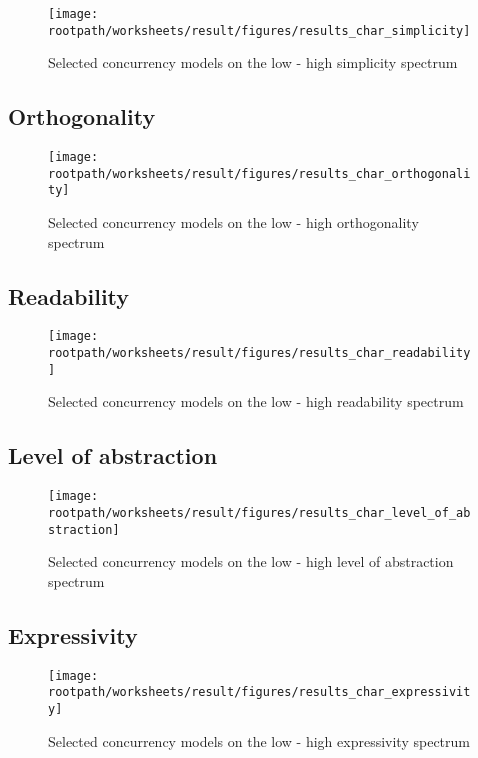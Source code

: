 \begin{figure}[htbp]
\centering
 \texttt{[image: \\rootpath/worksheets/result/figures/results\_char\_simplicity]} 
 \caption{Selected concurrency models on the low - high simplicity spectrum}
\label{fig:results_char_simplicity}
\end{figure}

\subsection{Orthogonality}


\begin{figure}[htbp]
\centering
 \texttt{[image: \\rootpath/worksheets/result/figures/results\_char\_orthogonality]} 
 \caption{Selected concurrency models on the low - high orthogonality spectrum}
\label{fig:results_char_orthogonality}
\end{figure}

\subsection{Readability}

\begin{figure}[htbp]
\centering
 \texttt{[image: \\rootpath/worksheets/result/figures/results\_char\_readability]} 
 \caption{Selected concurrency models on the low - high readability spectrum}
\label{fig:results_char_readability}
\end{figure}

\subsection{Level of abstraction}

\begin{figure}[htbp]
\centering
 \texttt{[image: \\rootpath/worksheets/result/figures/results\_char\_level\_of\_abstraction]} 
 \caption{Selected concurrency models on the low - high level of abstraction spectrum}
\label{fig:results_char_level_of_abstraction}
\end{figure}

\subsection{Expressivity}

\begin{figure}[htbp]
\centering
 \texttt{[image: \\rootpath/worksheets/result/figures/results\_char\_expressivity]} 
 \caption{Selected concurrency models on the low - high expressivity spectrum}
\label{fig:results_char_expressivity}
\end{figure}

